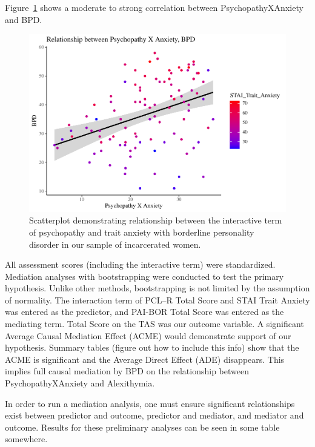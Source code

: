 \documentclass[
  man,floatsintext]{apa6}
\begin{document}
Figure~\ref{fig:a-path-scatterplot} shows a moderate to strong correlation between PsychopathyXAnxiety and BPD.



\begin{figure}
\includegraphics[width=1\linewidth]{d2m-Psychopathy_files/figure-latex/a-path-scatterplot-1} \caption{Scatterplot demonstrating relationship between the interactive term of psychopathy and trait anxiety with borderline personality disorder in our sample of incarcerated women.}\label{fig:a-path-scatterplot}
\end{figure}

All assessment scores (including the interactive term) were standardized. Mediation analyses with bootstrapping were conducted to test the primary hypothesis. Unlike other methods, bootstrapping is not limited by the assumption of normality. The interaction term of PCL--R Total Score and STAI Trait Anxiety was entered as the predictor, and PAI-BOR Total Score was entered as the mediating term. Total Score on the TAS was our outcome variable. A significant Average Causal Mediation Effect (ACME) would demonstrate support of our hypothesis. Summary tables (figure out how to include this info) show that the ACME is significant and the Average Direct Effect (ADE) disappears. This implies full causal mediation by BPD on the relationship between PsychopathyXAnxiety and Alexithymia.

In order to run a mediation analysis, one must ensure significant relationships exist between predictor and outcome, predictor and mediator, and mediator and outcome. Results for these preliminary analyses can be seen in some table somewhere.
\end{document}

